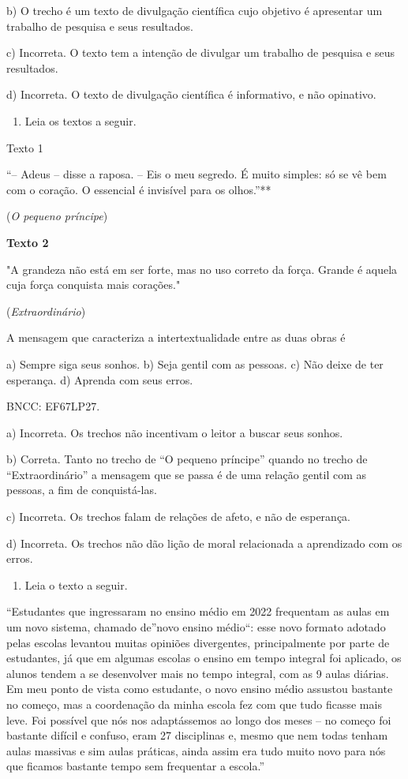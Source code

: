 b) O trecho é um texto de divulgação científica cujo objetivo é
apresentar um trabalho de pesquisa e seus resultados.

c) Incorreta. O texto tem a intenção de divulgar um trabalho de pesquisa
e seus resultados.

d) Incorreta. O texto de divulgação científica é informativo, e não
opinativo.

\begin{enumerate}
\def\labelenumi{\arabic{enumi}.}
\setcounter{enumi}{8}
\tightlist
\item
  Leia os textos a seguir.
\end{enumerate}

Texto 1

``-- Adeus -- disse a raposa. -- Eis o meu segredo. É muito simples: só
se vê bem com o coração. O essencial é invisível para os olhos.''**

(\emph{O pequeno príncipe})

\textbf{Texto 2}

"A grandeza não está em ser forte, mas no uso correto da força. Grande é
aquela cuja força conquista mais corações."

(\emph{Extraordinário})

A mensagem que caracteriza a intertextualidade entre as duas obras é

a) Sempre siga seus sonhos. b) Seja gentil com as pessoas. c) Não deixe
de ter esperança. d) Aprenda com seus erros.

BNCC: EF67LP27.

a) Incorreta. Os trechos não incentivam o leitor a buscar seus sonhos.

b) Correta. Tanto no trecho de ``O pequeno príncipe'' quando no trecho
de ``Extraordinário'' a mensagem que se passa é de uma relação gentil
com as pessoas, a fim de conquistá-las.

c) Incorreta. Os trechos falam de relações de afeto, e não de esperança.

d) Incorreta. Os trechos não dão lição de moral relacionada a
aprendizado com os erros.

\begin{enumerate}
\def\labelenumi{\arabic{enumi}.}
\setcounter{enumi}{9}
\tightlist
\item
  Leia o texto a seguir.
\end{enumerate}

``Estudantes que ingressaram no ensino médio em 2022 frequentam as aulas
em um novo sistema, chamado de''novo ensino médio``: esse novo formato
adotado pelas escolas levantou muitas opiniões divergentes,
principalmente por parte de estudantes, já que em algumas escolas o
ensino em tempo integral foi aplicado, os alunos tendem a se desenvolver
mais no tempo integral, com as 9 aulas diárias. Em meu ponto de vista
como estudante, o novo ensino médio assustou bastante no começo, mas a
coordenação da minha escola fez com que tudo ficasse mais leve. Foi
possível que nós nos adaptássemos ao longo dos meses -- no começo foi
bastante difícil e confuso, eram 27 disciplinas e, mesmo que nem todas
tenham aulas massivas e sim aulas práticas, ainda assim era tudo muito
novo para nós que ficamos bastante tempo sem frequentar a escola.''

